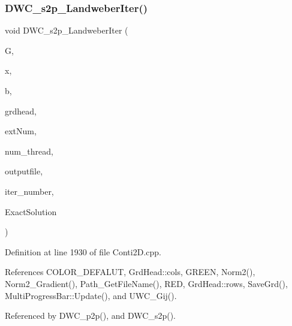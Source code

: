 \subsubsection{D\+W\+C\+\_\+s2p\+\_\+\+Landweber\+Iter()}
{\footnotesize\ttfamily void D\+W\+C\+\_\+s2p\+\_\+\+Landweber\+Iter (\begin{DoxyParamCaption}\item[{double $\ast$$\ast$}]{G,  }\item[{double $\ast$}]{x,  }\item[{double $\ast$}]{b,  }\item[{\textbf{ Grd\+Head}}]{grdhead,  }\item[{int}]{ext\+Num,  }\item[{int}]{num\+\_\+thread,  }\item[{string}]{outputfile,  }\item[{double}]{iter\+\_\+number,  }\item[{double $\ast$}]{Exact\+Solution }\end{DoxyParamCaption})}



Definition at line 1930 of file Conti2\+D.\+cpp.



References C\+O\+L\+O\+R\+\_\+\+D\+E\+F\+A\+L\+UT, Grd\+Head\+::cols, G\+R\+E\+EN, Norm2(), Norm2\+\_\+\+Gradient(), Path\+\_\+\+Get\+File\+Name(), R\+ED, Grd\+Head\+::rows, Save\+Grd(), Multi\+Progress\+Bar\+::\+Update(), and U\+W\+C\+\_\+\+Gij().



Referenced by D\+W\+C\+\_\+p2p(), and D\+W\+C\+\_\+s2p().

